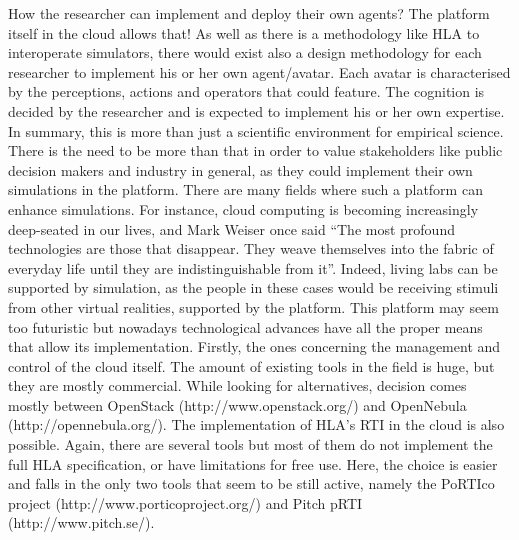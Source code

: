 \documentclass[a0paper,fontscale=0.4125,landscape]{baposter} %
\begin{document}
\begin{poster}
{How the researcher can implement and deploy their own agents? The platform itself in the cloud allows that! As well as there is a methodology like HLA to interoperate simulators, there would exist also a design methodology for each researcher to implement his or her own agent/avatar. Each avatar is characterised by the perceptions, actions and operators that could feature. The cognition is decided by the researcher and is expected to implement his or her own expertise. In summary, this is more than just a scientific environment for empirical science. There is the need to be more than that in order to value stakeholders like public decision makers and industry in general, as they could implement their own simulations in the platform.
There are many fields where such a platform can enhance simulations. For instance, cloud computing is becoming increasingly deep-seated in our lives, and Mark Weiser once said ``The most profound technologies are those that disappear. They weave themselves into the fabric of everyday life until they are indistinguishable from it''. Indeed, living labs can be supported by simulation, as the people in these cases would be receiving stimuli from other virtual realities, supported by the platform.
This platform may seem too futuristic but nowadays technological advances have all the proper means that allow its implementation. Firstly, the ones concerning the management and control of the cloud itself. The amount of existing tools in the field is huge, but they are mostly commercial. While looking for alternatives, decision comes mostly between OpenStack (http://www.openstack.org/) and OpenNebula (http://opennebula.org/).
The implementation of HLA's RTI in the cloud is also possible. Again, there are several tools but most of them do not implement the full HLA specification, or have limitations for free use. Here, the choice is easier and falls in the only two tools that seem to be still active, namely the PoRTIco project (http://www.porticoproject.org/) and Pitch pRTI (http://www.pitch.se/).


}

 {
}


\end{poster}
\end{document}
